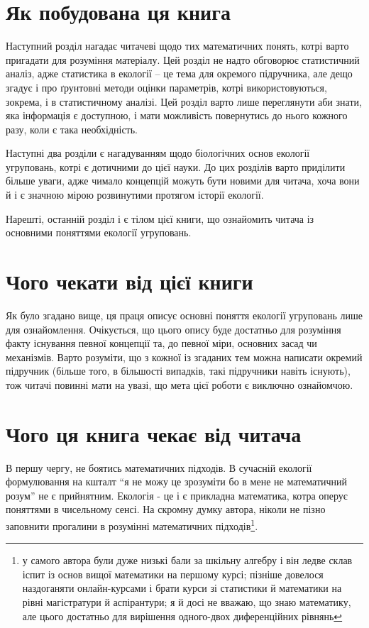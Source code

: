 \documentclass[
  11pt,
]{book}
\begin{document}
\section{Як побудована ця книга}\label{how-built}

Наступний розділ нагадає читачеві щодо тих математичних понять, котрі
варто пригадати для розуміння матеріалу. Цей розділ не надто обговорює
статистичний аналіз, адже статистика в екології -- це тема для окремого
підручника, але дещо згадує і про ґрунтовні методи оцінки параметрів,
котрі використовуються, зокрема, і в статистичному аналізі. Цей розділ
варто лише переглянути аби знати, яка інформація є доступною, і мати
можливість повернутись до нього кожного разу, коли є така необхідність.

Наступні два розділи є нагадуванням щодо біологічних основ екології
угруповань, котрі є дотичними до цієї науки. До цих розділів варто
приділити більше уваги, адже чимало концепцій можуть бути новими для
читача, хоча вони й і є значною мірою розвинутими протягом історії
екології.

Нарешті, останній розділ і є тілом цієї книги, що ознайомить читача із
основними поняттями екології угруповань.

\section{Чого чекати від цієї книги}\label{expect}

Як було згадано вище, ця праця описує основні поняття екології
угруповань лише для ознайомлення. Очікується, що цього опису буде
достатньо для розуміння факту існування певної концепції та, до певної
міри, основних засад чи механізмів. Варто розуміти, що з кожної із
згаданих тем можна написати окремий підручник (більше того, в більшості
випадків, такі підручники навіть існують), тож читачі повинні мати на
увазі, що мета цієї роботи є виключно ознайомчою.

\section{Чого ця книга чекає від читача}\label{expected}

В першу чергу, не боятись математичних підходів. В сучасній екології
формулювання на кшталт ``я не можу це зрозуміти бо в мене не
математичний розум'' не є прийнятним. Екологія - це і є прикладна
математика, котра оперує поняттями в чисельному сенсі. На скромну думку
автора, ніколи не пізно заповнити прогалини в розумінні математичних
підходів\footnote{у самого автора були дуже низькі бали за шкільну
  алгебру і він ледве склав іспит із основ вищої математики на першому
  курсі; пізніше довелося наздоганяти онлайн-курсами і брати курси зі
  статистики й математики на рівні магістратури й аспірантури; я й досі
  не вважаю, що знаю математику, але цього достатньо для вирішення
  одного-двох диференційних рівнянь}.
\end{document}
